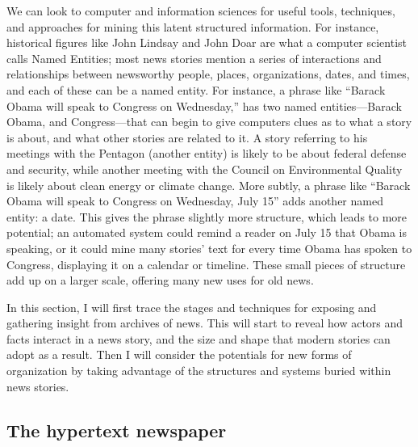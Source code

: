 We can look to computer and information sciences for useful tools, techniques, and approaches for mining this latent structured information. For instance, historical figures like John Lindsay and John Doar are what a computer scientist calls Named Entities; most news stories mention a series of interactions and relationships between newsworthy people, places, organizations, dates, and times, and each of these can be a named entity. For instance, a phrase like ``Barack Obama will speak to Congress on Wednesday,'' has two named entities---Barack Obama, and Congress---that can begin to give computers clues as to what a story is about, and what other stories are related to it. A story referring to his meetings with the Pentagon (another entity) is likely to be about federal defense and security, while another meeting with the Council on Environmental Quality is likely about clean energy or climate change. More subtly, a phrase like ``Barack Obama will speak to Congress on Wednesday, July 15'' adds another named entity: a date. This gives the phrase slightly more structure, which leads to more potential; an automated system could remind a reader on July 15 that Obama is speaking, or it could mine many stories' text for every time Obama has spoken to Congress, displaying it on a calendar or timeline. These small pieces of structure add up on a larger scale, offering many new uses for old news.


In this section, I will first trace the stages and techniques for exposing and gathering insight from archives of news. This will start to reveal how actors and facts interact in a news story, and the size and shape that modern stories can adopt as a result. Then I will consider the potentials for new forms of organization by taking advantage of the structures and systems buried within news stories.

\subsection{The hypertext newspaper}

